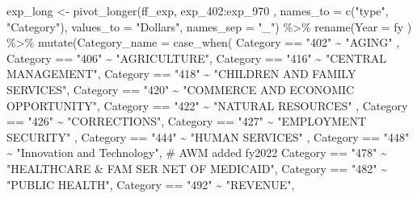 \documentclass[
  letterpaper,
  DIV=11,
  numbers=noendperiod]{scrreport}
\newenvironment{Shaded}{\begin{snugshade}}{\end{snugshade}}
\newcommand{\AttributeTok}[1]{\textcolor[rgb]{0.40,0.45,0.13}{#1}}
\newcommand{\CommentTok}[1]{\textcolor[rgb]{0.37,0.37,0.37}{#1}}
\newcommand{\FunctionTok}[1]{\textcolor[rgb]{0.28,0.35,0.67}{#1}}
\newcommand{\NormalTok}[1]{\textcolor[rgb]{0.00,0.23,0.31}{#1}}
\newcommand{\OtherTok}[1]{\textcolor[rgb]{0.00,0.23,0.31}{#1}}
\newcommand{\SpecialCharTok}[1]{\textcolor[rgb]{0.37,0.37,0.37}{#1}}
\newcommand{\StringTok}[1]{\textcolor[rgb]{0.13,0.47,0.30}{#1}}
\begin{document}
\begin{Shaded}
\begin{Highlighting}[]
\NormalTok{exp\_long }\OtherTok{\textless{}{-}} \FunctionTok{pivot\_longer}\NormalTok{(ff\_exp, exp\_402}\SpecialCharTok{:}\NormalTok{exp\_970 , }\AttributeTok{names\_to =} \FunctionTok{c}\NormalTok{(}\StringTok{"type"}\NormalTok{, }\StringTok{"Category"}\NormalTok{), }\AttributeTok{values\_to =} \StringTok{"Dollars"}\NormalTok{, }\AttributeTok{names\_sep =} \StringTok{"\_"}\NormalTok{) }\SpecialCharTok{\%\textgreater{}\%} 
  \FunctionTok{rename}\NormalTok{(}\AttributeTok{Year =}\NormalTok{ fy ) }\SpecialCharTok{\%\textgreater{}\%} 
  \FunctionTok{mutate}\NormalTok{(}\AttributeTok{Category\_name =} 
           \FunctionTok{case\_when}\NormalTok{(}
\NormalTok{             Category }\SpecialCharTok{==} \StringTok{"402"} \SpecialCharTok{\textasciitilde{}} \StringTok{"AGING"}\NormalTok{ ,}
\NormalTok{             Category }\SpecialCharTok{==} \StringTok{"406"} \SpecialCharTok{\textasciitilde{}} \StringTok{"AGRICULTURE"}\NormalTok{, }
\NormalTok{             Category }\SpecialCharTok{==} \StringTok{"416"} \SpecialCharTok{\textasciitilde{}} \StringTok{"CENTRAL MANAGEMENT"}\NormalTok{,}
\NormalTok{             Category }\SpecialCharTok{==} \StringTok{"418"} \SpecialCharTok{\textasciitilde{}} \StringTok{"CHILDREN AND FAMILY SERVICES"}\NormalTok{, }
\NormalTok{             Category }\SpecialCharTok{==} \StringTok{"420"} \SpecialCharTok{\textasciitilde{}} \StringTok{"COMMERCE AND ECONOMIC OPPORTUNITY"}\NormalTok{,}
\NormalTok{             Category }\SpecialCharTok{==} \StringTok{"422"} \SpecialCharTok{\textasciitilde{}} \StringTok{"NATURAL RESOURCES"}\NormalTok{ ,}
\NormalTok{             Category }\SpecialCharTok{==} \StringTok{"426"} \SpecialCharTok{\textasciitilde{}} \StringTok{"CORRECTIONS"}\NormalTok{,}
\NormalTok{             Category }\SpecialCharTok{==} \StringTok{"427"} \SpecialCharTok{\textasciitilde{}} \StringTok{"EMPLOYMENT SECURITY"}\NormalTok{ ,}
\NormalTok{             Category }\SpecialCharTok{==} \StringTok{"444"} \SpecialCharTok{\textasciitilde{}} \StringTok{"HUMAN SERVICES"}\NormalTok{ ,}
\NormalTok{             Category }\SpecialCharTok{==} \StringTok{"448"} \SpecialCharTok{\textasciitilde{}} \StringTok{"Innovation and Technology"}\NormalTok{, }\CommentTok{\# AWM added fy2022}
\NormalTok{             Category }\SpecialCharTok{==} \StringTok{"478"} \SpecialCharTok{\textasciitilde{}} \StringTok{"HEALTHCARE \& FAM SER NET OF MEDICAID"}\NormalTok{, }
\NormalTok{             Category }\SpecialCharTok{==} \StringTok{"482"} \SpecialCharTok{\textasciitilde{}} \StringTok{"PUBLIC HEALTH"}\NormalTok{, }
\NormalTok{             Category }\SpecialCharTok{==} \StringTok{"492"} \SpecialCharTok{\textasciitilde{}} \StringTok{"REVENUE"}\NormalTok{, }

\end{Highlighting}
\end{Shaded}
\end{document}
